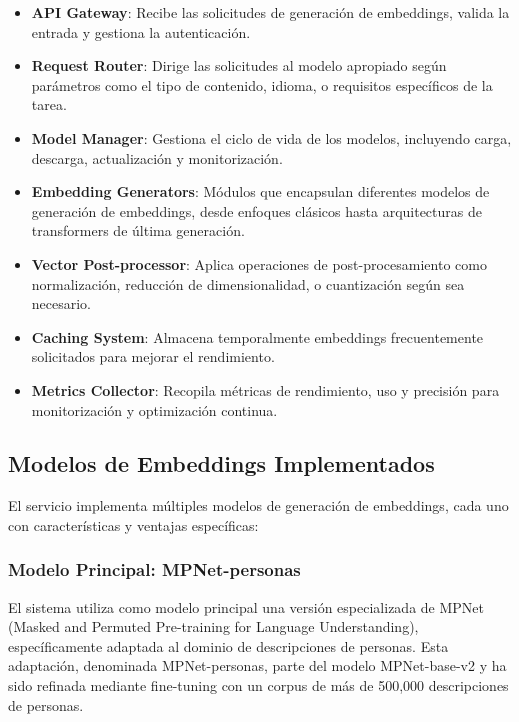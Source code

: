 \documentclass[12pt,a4paper]{article}
\begin{document}
\begin{itemize}
    \item \textbf{API Gateway}: Recibe las solicitudes de generación de embeddings, valida la entrada y gestiona la autenticación.
    
    \item \textbf{Request Router}: Dirige las solicitudes al modelo apropiado según parámetros como el tipo de contenido, idioma, o requisitos específicos de la tarea.
    
    \item \textbf{Model Manager}: Gestiona el ciclo de vida de los modelos, incluyendo carga, descarga, actualización y monitorización.
    
    \item \textbf{Embedding Generators}: Módulos que encapsulan diferentes modelos de generación de embeddings, desde enfoques clásicos hasta arquitecturas de transformers de última generación.
    
    \item \textbf{Vector Post-processor}: Aplica operaciones de post-procesamiento como normalización, reducción de dimensionalidad, o cuantización según sea necesario.
    
    \item \textbf{Caching System}: Almacena temporalmente embeddings frecuentemente solicitados para mejorar el rendimiento.
    
    \item \textbf{Metrics Collector}: Recopila métricas de rendimiento, uso y precisión para monitorización y optimización continua.
\end{itemize}

\subsection{Modelos de Embeddings Implementados}
\label{subsec:es-modelos}

El servicio implementa múltiples modelos de generación de embeddings, cada uno con características y ventajas específicas:

\subsubsection{Modelo Principal: MPNet-personas}
El sistema utiliza como modelo principal una versión especializada de MPNet (Masked and Permuted Pre-training for Language Understanding), específicamente adaptada al dominio de descripciones de personas. Esta adaptación, denominada MPNet-personas, parte del modelo MPNet-base-v2 y ha sido refinada mediante fine-tuning con un corpus de más de 500,000 descripciones de personas.
\end{document}
